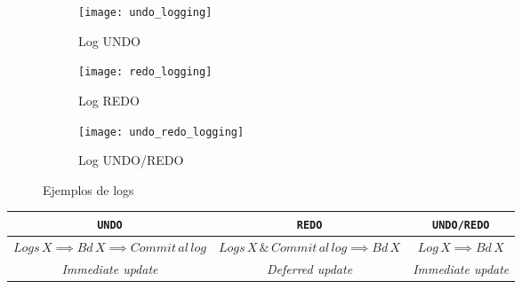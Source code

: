 \documentclass[a4paper, twoside]{article}
\begin{document}
\begin{figure}[H]
	\centering
	\begin{subfigure}{0.48\textwidth}
		\texttt{[image: undo\_logging]}
		\caption{Log UNDO}
	\end{subfigure}
	\begin{subfigure}{0.48\textwidth}
		\texttt{[image: redo\_logging]}
		\caption{Log REDO}
	\end{subfigure}
	\begin{subfigure}{0.48\textwidth}
		\texttt{[image: undo\_redo\_logging]}
		\caption{Log UNDO/REDO}
	\end{subfigure}
	\caption{Ejemplos de logs}
\end{figure}

\begin{center}
	\begin{tabular}{|c|c|c|}
		\hline 
		\texttt{\textbf{UNDO}} & \texttt{\textbf{REDO}} & \texttt{\textbf{UNDO/REDO}}\\
		\hline 
		\hline 
		$Logs\, X\implies Bd\, X\implies Commit\, al\, log$ & $Logs\, X\,\&\, Commit\, al\, log\implies Bd\, X$ & $Log\, X\implies Bd\, X$\\
		\hline 
		\emph{Immediate update} & \emph{Deferred update} & \emph{Immediate update}\\
		\hline 
	\end{tabular}
\end{center}


\makeseccioncolaboradores %

\makehistorial
\end{document}
